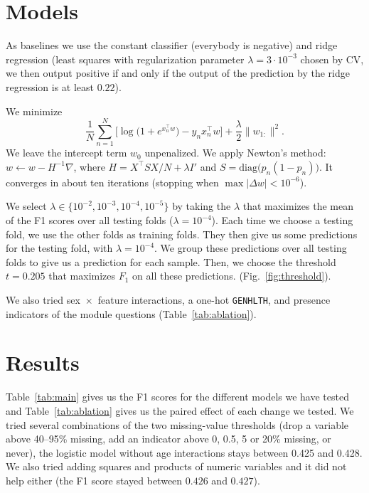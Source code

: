 \documentclass[10pt,conference,compsocconf]{IEEEtran}
\begin{document}
\section{Models}
As baselines we use the constant classifier (everybody is negative) and ridge regression (least squares with regularization parameter $\lambda = 3\cdot10^{-3}$ chosen by CV, we then output positive if and only if the output of the prediction by the ridge regression is at least $0.22$).

We minimize
\begin{equation}
\frac{1}{N}\sum_{n=1}^{N}\Big[\log\big(1+e^{x_n^\top w}\big)-y_n x_n^\top w\Big] + \frac{\lambda}{2}\lVert w_{1:}\rVert^2.
\end{equation}
We leave the intercept term $w_0$ unpenalized. We apply Newton's method: $w \leftarrow w - H^{-1}\nabla$, where $H = X^\top S X / N + \lambda I'$ and $S = \mathrm{diag}\big(p_n(1-p_n)\big)$. It converges in about ten iterations (stopping when $\max|\Delta w| < 10^{-6}$).

We select $\lambda \in \{10^{-2}, 10^{-3}, 10^{-4}, 10^{-5}\}$ by taking the $\lambda$ that maximizes the mean of the F1 scores over all testing folds ($\lambda = 10^{-4}$). Each time we choose a testing fold, we use the other folds as training folds. They then give us some predictions for the testing fold, with $\lambda = 10^{-4}$. We group these predictions over all testing folds to give us a prediction for each sample. Then, we choose the threshold $t = 0.205$ that maximizes $F_1$ on all these predictions. (Fig.~\ref{fig:threshold}).

We also tried sex~$\times$~feature interactions, a one-hot \texttt{GENHLTH}, and presence indicators of the module questions (Table~\ref{tab:ablation}).


\section{Results}
Table~\ref{tab:main} gives us the F1 scores for the different models we have tested and Table~\ref{tab:ablation} gives us the paired effect of each change we tested. We tried several combinations of the two missing-value thresholds (drop a variable above 40--95\% missing, add an indicator above 0, 0.5, 5 or 20\% missing, or never), the logistic model without age interactions stays between 0.425 and 0.428. We also tried adding squares and products of numeric variables and it did not help either (the F1 score stayed between $0.426$ and $0.427$).
\end{document}
